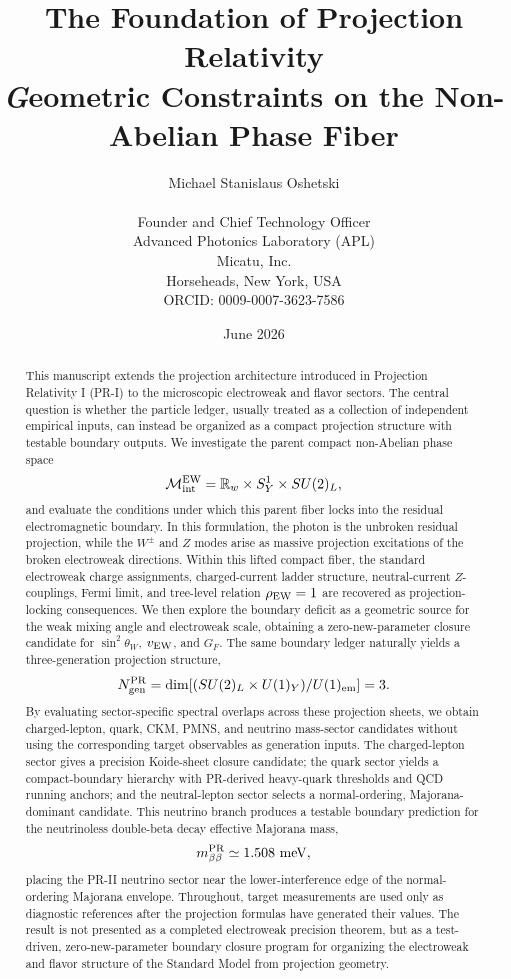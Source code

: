 \documentclass[11pt]{article}
\title{The Foundation of Projection Relativity \uppercase\expandafter{\romannumeral2}\\
\Large \textit Geometric Constraints on the Non-Abelian Phase Fiber}
\author{Michael Stanislaus Oshetski \orcidlink{0009-0007-3623-7586} \\
\small \email{michael.oshetski@micatu.com}\\
\small Founder and Chief Technology Officer \\
\small Advanced Photonics Laboratory (APL)\\
\small Micatu, Inc. \\
\small Horseheads, New York, USA \\
\small ORCID: 0009-0007-3623-7586
\date {June 2026}}
\begin{document}
\maketitle
\begin{abstract}
This manuscript extends the projection architecture introduced in Projection Relativity I (PR-I) to the microscopic electroweak and flavor sectors. The central question is whether the particle ledger, usually treated as a collection of independent empirical inputs, can instead be organized as a compact projection structure with testable boundary outputs. We investigate the parent compact non-Abelian phase space
\[
\mathcal{M}_{\rm int}^{\rm EW}
=
\mathbb{R}_w
\times
S_Y^1
\times
SU(2)_L,
\]
and evaluate the conditions under which this parent fiber locks into the residual electromagnetic boundary. In this formulation, the photon is the unbroken residual projection, while the \(W^\pm\) and \(Z\) modes arise as massive projection excitations of the broken electroweak directions. Within this lifted compact fiber, the standard electroweak charge assignments, charged-current ladder structure, neutral-current \(Z\)-couplings, Fermi limit, and tree-level relation \(\rho_{\rm EW}=1\) are recovered as projection-locking consequences. We then explore the boundary deficit as a geometric source for the weak mixing angle and electroweak scale, obtaining a zero-new-parameter closure candidate for \(\sin^2\theta_W\), \(v_{\rm EW}\), and \(G_F\). The same boundary ledger naturally yields a three-generation projection structure,
\[
N_{\rm gen}^{\rm PR}
=
\dim\!\left[
(SU(2)_L\times U(1)_Y)/U(1)_{\rm em}
\right]
=
3.
\]
By evaluating sector-specific spectral overlaps across these projection sheets, we obtain charged-lepton, quark, CKM, PMNS, and neutrino mass-sector candidates without using the corresponding target observables as generation inputs. The charged-lepton sector gives a precision Koide-sheet closure candidate; the quark sector yields a compact-boundary hierarchy with PR-derived heavy-quark thresholds and QCD running anchors; and the neutral-lepton sector selects a normal-ordering, Majorana-dominant candidate. This neutrino branch produces a testable boundary prediction for the neutrinoless double-beta decay effective Majorana mass,
\[
m_{\beta\beta}^{\rm PR}
\simeq
1.508\ {\rm meV},
\]
placing the PR-II neutrino sector near the lower-interference edge of the normal-ordering Majorana envelope. Throughout, target measurements are used only as diagnostic references after the projection formulas have generated their values. The result is not presented as a completed electroweak precision theorem, but as a test-driven, zero-new-parameter boundary closure program for organizing the electroweak and flavor structure of the Standard Model from projection geometry.
\end{abstract}
\end{document}
